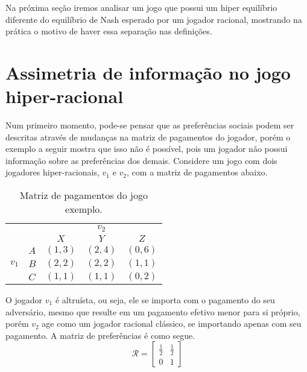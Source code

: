 Na próxima seção iremos analisar um jogo que possui um hiper equilíbrio diferente do equilíbrio de Nash esperado por um jogador racional, mostrando na prática o motivo de haver essa separação nas definições.


\section{Assimetria de informação no jogo hiper-racional}

Num primeiro momento, pode-se pensar que as preferências sociais podem ser descritas através de mudanças na matriz de pagamentos do jogador, porém o exemplo a seguir mostra que isso não é possível, pois um jogador não possui informação sobre as preferências dos demais. Considere um jogo com dois jogadores hiper-racionais, $v_1$ e $v_2$, com a matriz de pagamentos abaixo.
\begin{table}[h]
\begin{center}
    \begin{tabular}{ccccc}
        & & \multicolumn{3}{c}{$v_2$} \\
        & & $X$ & $Y$ & $Z$ \\ \cline{3-5} 
        \multirow{3}{*}{$v_1$} & \multicolumn{1}{c|}{$A$} & \multicolumn{1}{l|}{$(1,3)$} & \multicolumn{1}{l|}{$(2,4)$} & \multicolumn{1}{l|}{$(0,6)$} \\ \cline{3-5} 
        & \multicolumn{1}{c|}{$B$} & \multicolumn{1}{l|}{$(2,2)$}  & \multicolumn{1}{l|}{$(2,2)$} & \multicolumn{1}{l|}{$(1,1)$}  \\ \cline{3-5} 
        & \multicolumn{1}{l|}{$C$} & \multicolumn{1}{l|}{$(1,1)$}  & \multicolumn{1}{l|}{$(1,1)$} & \multicolumn{1}{l|}{$(0,2)$} \\ \cline{3-5} 
    \end{tabular}
    \caption{Matriz de pagamentos do jogo exemplo.}
    \label{JogoHRassimetrico}
\end{center}
\end{table}

O jogador $v_1$ é altruísta, ou seja, ele se importa com o pagamento do seu adversário, mesmo que resulte em um pagamento efetivo menor para si próprio, porém $v_2$ age como um jogador racional clássico, se importando apenas com seu pagamento. A matriz de preferências é como segue.
\begin{equation}
    \label{matrizPrefAssimetrico}
    \mathcal{R}=
    \begin{bmatrix}
        \frac{1}{2} & \frac{1}{2}\\ 
        0 & 1 
    \end{bmatrix}
\end{equation}

